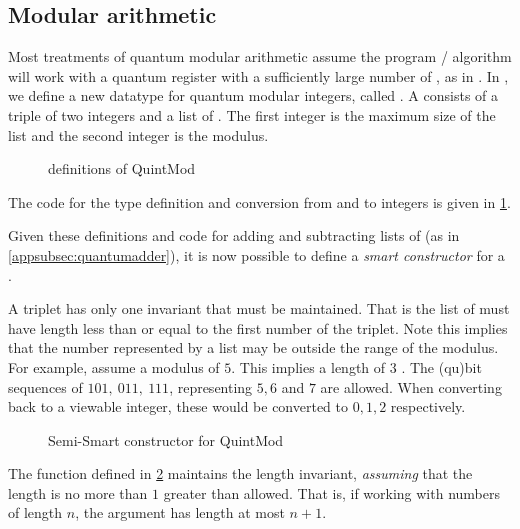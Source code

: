 \subsection{Modular arithmetic}\label{subsec:examplemodarith}
Most treatments of quantum modular arithmetic assume the program / algorithm
will work with a quantum register with a sufficiently large number of \qubits,
as in \cite{Vedral:1995ga}.
In \lqpl, we define a new datatype for quantum modular integers, called
.  A  consists of a triple of two integers 
and a list of \qubits. The first integer is the maximum size of the list and 
the second integer is the modulus.


\begin{figure}[htbp]

\caption{\lqpl{} definitions of QuintMod}\label{fig:quintmods}
\end{figure}

The code for the type definition and conversion from and to integers is 
given in \ref{fig:quintmods}. 

Given these definitions and code for adding and subtracting lists
of \qubits (as in \ref{appsubsec:quantumadder}), it is now
possible to define a \emph{smart constructor} for a . 

A  triplet has only one invariant that must be maintained. 
That is the list of \qubits{} must have length less than or equal to 
the first number of the triplet. Note this implies that the number represented
by a \qubit{} list may be outside the range of the modulus. For example, 
assume a modulus of $5$. This implies a length of $3$ \qubits. The (qu)bit 
sequences of $101,\ 011,\ 111$, representing $5,6$ and $7$ are allowed.
When converting back to a viewable integer, these would be converted to 
$0,1,2$ respectively.


\begin{figure}[htbp]

\caption{Semi-Smart constructor for QuintMod}\label{fig:makequintmods}
\end{figure}

The function  defined in \ref{fig:makequintmods} maintains
the length invariant, \emph{assuming} that the length is no more than $1$ greater
than allowed. That is, if working with  numbers of length
$n$, the  argument has length at most $n + 1$. 

